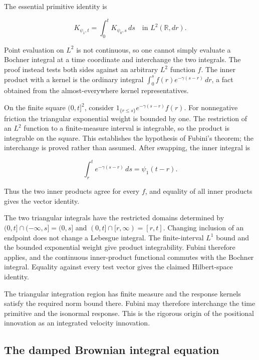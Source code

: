 \documentclass[11pt,a4paper]{report}
\begin{document}
The essential primitive identity is

\[K_{\psi_1,t}=\int_0^t K_{\psi_0,s}\,ds\quad\text{in }L^2(\mathbb R,dr).\]

Point evaluation on \(L^{2}\) is not continuous, so one cannot simply evaluate a Bochner integral at a time coordinate and interchange the two integrals. The proof instead tests both sides against an arbitrary \(L^{2}\) function \(f\). The inner product with a kernel is the ordinary integral \(\int_0^s f(r)e^{-\gamma(s-r)}\,dr\), a fact obtained from the almost-everywhere kernel representatives.



On the finite square \((0,t]^2\), consider \(1_{\{r\le s\}}e^{-\gamma(s-r)}f(r)\). For nonnegative friction the triangular exponential weight is bounded by one. The restriction of an \(L^{2}\) function to a finite-measure interval is integrable, so the product is integrable on the square. This establishes the hypothesis of Fubini's theorem; the interchange is proved rather than assumed. After swapping, the inner integral is

\[\int_r^t e^{-\gamma(s-r)}\,ds=\psi_1(t-r).\]

Thus the two inner products agree for every \(f\), and equality of all inner products gives the vector identity.



The two triangular integrals have the restricted domains determined by \((0,t]\cap(-\infty,s]=(0,s]\) and \((0,t]\cap[r,\infty)=[r,t]\). Changing inclusion of an endpoint does not change a Lebesgue integral. The finite-interval \(L^{1}\) bound and the bounded exponential weight give product integrability. Fubini therefore applies, and the continuous inner-product functional commutes with the Bochner integral. Equality against every test vector gives the claimed Hilbert-space identity.



The triangular integration region has finite measure and the response kernels satisfy the required norm bound there. Fubini may therefore interchange the time primitive and the isonormal response. This is the rigorous origin of the positional innovation as an integrated velocity innovation.

\subsection{\texorpdfstring{The damped Brownian integral equation}{The damped Brownian integral equation}}
\label{report-step-KineticLangevin-BrownianConvolution-lean-9}
\end{document}
